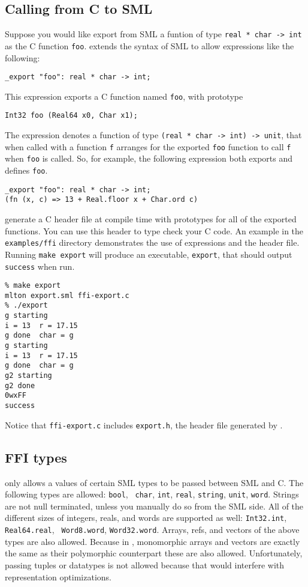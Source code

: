 \subsection{Calling from C to SML}
Suppose you would like export from SML a funtion of type {\tt real *
char -> int} as the C function {\tt foo}.  {\mlton} extends the syntax
of SML to allow expressions like the following:
\begin{verbatim}
_export "foo": real * char -> int;
\end{verbatim}
This expression exports a C function named {\tt foo}, with prototype
\begin{verbatim}
Int32 foo (Real64 x0, Char x1);
\end{verbatim}
The {\export} expression denotes a function of type {\tt (real * char
-> int) -> unit}, that when called with a function {\tt f} arranges
for the exported {\tt foo} function to call {\tt f} when {\tt foo} is
called.  So, for example, the following expression both exports and
defines {\tt foo}.
\begin{verbatim}
_export "foo": real * char -> int;
(fn (x, c) => 13 + Real.floor x + Char.ord c)
\end{verbatim}

{\mlton} generate a C header file at compile time with prototypes for
all of the exported functions.  You can use this header to type check
your C code.  An example in the {\tt examples/ffi} directory
demonstrates the use of {\export} expressions and the header file.
Running {\tt make export} will produce an executable, {\tt export},
that should output {\tt success} when run.

\begin{verbatim}
% make export
mlton export.sml ffi-export.c
% ./export
g starting
i = 13  r = 17.15
g done  char = g
g starting
i = 13  r = 17.15
g done  char = g
g2 starting
g2 done
0wxFF
success
\end{verbatim}

Notice that {\tt ffi-export.c} includes {\tt export.h}, the header
file generated by {\mlton}.

\subsection{FFI types}

{\mlton} only allows a values of certain SML types to be passed
between SML and C.  The following types are allowed: {\tt bool}, {\tt
char}, {\tt int}, {\tt real}, {\tt string}, {\tt unit}, {\tt word}.
Strings are not null terminated, unless you manually do so from the
SML side.  All of the different sizes of integers, reals, and words
are supported as well: {\tt Int32.int}, {\tt Real64.real}, {\tt
Word8.word}, {\tt Word32.word}.  Arrays, refs, and vectors of the
above types are also allowed.  Because in {\mlton}, monomorphic arrays
and vectors are exactly the same as their polymorphic counterpart
these are also allowed.  Unfortunately, passing tuples or datatypes is
not allowed because that would interfere with representation
optimizations.

